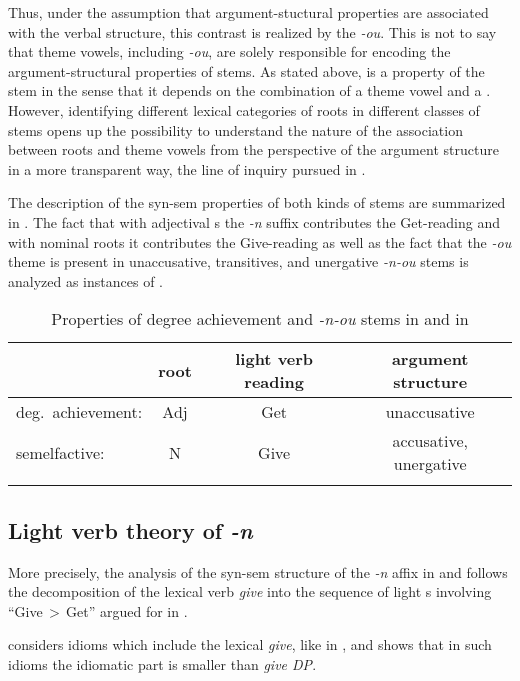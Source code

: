  Thus, under the assumption that argument-stuctural properties are associated with the verbal structure, this contrast is realized by the  \textit{-ou}. This is not to say that theme vowels, including \textit{-ou}, are solely responsible for encoding the argument-structural properties of  stems. As stated above,  is a property of the stem in the sense that it depends on the combination of a theme vowel and a . However, identifying different lexical categories of roots in different classes of stems opens up the possibility to understand the nature of the association between roots and theme vowels from the perspective of the argument structure in a more transparent way, the line of inquiry pursued in \cite{Jablonska2007}.
\par The description of the syn-sem properties of both kinds of stems are summarized in  . The fact that with adjectival s the \textit{-n} suffix contributes the Get-reading  and with nominal roots it contributes the Give-reading  as well as the fact that the \textit{-ou} theme is present in unaccusative, transitives, and unergative \textit{-n-ou} stems is analyzed as instances of .

\begin{table}
\caption{Properties of degree achievement and   \textit{-n-ou} stems in  and  in \cite{NU}}
\label{tab:summary}
\begin{tabular}{ l  c  c  c }
\lsptoprule		
				& root	& light verb reading	& argument structure\\\midrule
deg.\ achievement: 	& Adj	& Get  				& unaccusative\\
 semelfactive: 		& N   	& Give 				& accusative, unergative\\
\lspbottomrule
\end{tabular}
\end{table}

\subsection{Light verb theory of \textit{-n}}

More precisely, the analysis  of the syn-sem structure of the \textit{-n} affix in  and  follows the decomposition of the  lexical verb \textit{give} into the sequence of light s involving ``Give\,$>$\,Get'' argued for in \cite{Richards2001}.
\par
\cite{Richards2001} considers  idioms which include the lexical \textit{give}, like in \Next, and shows that in such idioms the idiomatic part is smaller than \textit{give DP}.

